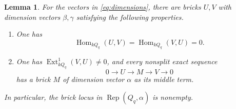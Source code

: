 \documentclass[a4paper,reqno,10pt]{amsart}
\newtheorem{lemma}[theorem]{Lemma}
\theoremstyle{definition}
\numberwithin{equation}{section}
\newcommand{\Hom}{\operatorname{Hom}}
\newcommand{\Ext}{\operatorname{Ext}}
\newcommand{\Rep}{\operatorname{Rep}}
\begin{document}
\begin{lemma}\label{lem:brick-pairs}
For the vectors in \eqref{eq:dimensions}, there are bricks $U,V$ with
dimension vectors $\beta,\gamma$ satisfying the following properties.
\begin{enumerate}
\item\label{item:brick-pair-hom} One has
\[
 \Hom_{k Q_q}(U,V)=\Hom_{k Q_q}(V,U)=0.
\]
\item\label{item:brick-pair-ext} One has $\Ext^1_{k Q_q}(V,U)\ne0$, and every nonsplit exact sequence
\[
 0\longrightarrow U\longrightarrow M\longrightarrow V\longrightarrow0
\]
has a brick $M$ of dimension vector $\alpha$ as its middle term.
\end{enumerate}
In particular, the brick locus in $\Rep(Q_q,\alpha)$ is nonempty.
\end{lemma}
\end{document}
